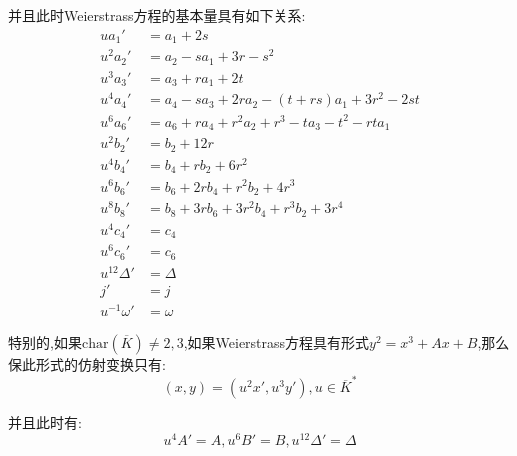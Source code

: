 \begin{enumerate}
	并且此时Weierstrass方程的基本量具有如下关系:
	\begin{align*}
		ua_1'&=a_1+2s\\
		u^2a_2'&=a_2-sa_1+3r-s^2\\
		u^3a_3'&=a_3+ra_1+2t\\
		u^4a_4'&=a_4-sa_3+2ra_2-(t+rs)a_1+3r^2-2st\\
		u^6a_6'&=a_6+ra_4+r^2a_2+r^3-ta_3-t^2-rta_1\\
		u^2b_2'&=b_2+12r\\
		u^4b_4'&=b_4+rb_2+6r^2\\
		u^6b_6'&=b_6+2rb_4+r^2b_2+4r^3\\
		u^8b_8'&=b_8+3rb_6+3r^2b_4+r^3b_2+3r^4\\
		u^4c_4'&=c_4\\
		u^6c_6'&=c_6\\
		u^{12}\Delta'&=\Delta\\
		j'&=j\\
		u^{-1}\omega'&=\omega
	\end{align*}
	
	特别的,如果$\mathrm{char}(\overline{K})\not=2,3$,如果Weierstrass方程具有形式$y^2=x^3+Ax+B$,那么保此形式的仿射变换只有:
	$$(x,y)=(u^2x',u^3y'),u\in\overline{K}^*$$
	
	并且此时有:
	$$u^4A'=A,u^6B'=B,u^{12}\Delta'=\Delta$$
\end{enumerate}

